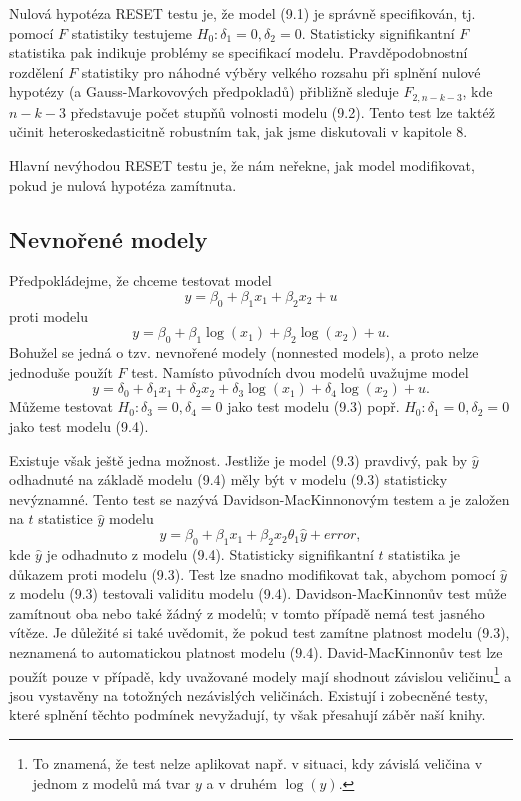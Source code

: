 Nulová hypotéza RESET testu je, že model (9.1) je správně specifikován, tj. pomocí $F$ statistiky testujeme $H_0: \delta_1 = 0, \delta_2 = 0$. Statisticky signifikantní $F$ statistika pak indikuje problémy se specifikací modelu. Pravděpodobnostní rozdělení $F$ statistiky pro náhodné výběry velkého rozsahu při splnění nulové hypotézy (a Gauss-Markovových předpokladů) přibližně sleduje $F_{2, n - k -3}$, kde $n - k - 3$ představuje počet stupňů volnosti modelu (9.2). Tento test lze taktéž učinit heteroskedasticitně robustním tak, jak jsme diskutovali v kapitole 8.

Hlavní nevýhodou RESET testu je, že nám neřekne, jak model modifikovat, pokud je nulová hypotéza zamítnuta.

\subsection{Nevnořené modely}

Předpokládejme, že chceme testovat model
\begin{equation}
y = \beta_0 + \beta_1 x_1 + \beta_2 x_2 + u
\end{equation}
proti modelu
\begin{equation}
y = \beta_0 + \beta_1 \log(x_1) + \beta_2 \log(x_2) + u.
\end{equation}
Bohužel se jedná o tzv. nevnořené modely (nonnested models), a proto nelze jednoduše použít $F$ test. Namísto původních dvou modelů uvažujme model
\begin{equation}
y = \delta_0 + \delta_1 x_1 + \delta_2 x_2 + \delta_3 \log(x_1) + \delta_4 \log(x_2) + u.
\end{equation}
Můžeme testovat $H_0: \delta_3 = 0, \delta_4 = 0$ jako test modelu (9.3) popř. $H_0: \delta_1 = 0, \delta_2 = 0$ jako test modelu (9.4).

Existuje však ještě jedna možnost. Jestliže je model (9.3) pravdivý, pak by $\hat{y}$ odhadnuté na základě modelu (9.4) měly být v modelu (9.3) statisticky nevýznamné. Tento test se nazývá Davidson-MacKinnonovým testem a je založen na $t$ statistice $\hat{y}$ modelu
\begin{equation}
y = \beta_0 + \beta_1 x_1 + \beta_2 x_2 \theta_1 \hat{y} + error,
\end{equation}
kde $\hat{y}$ je odhadnuto z modelu (9.4). Statisticky signifikantní $t$ statistika je důkazem proti modelu (9.3). Test lze snadno modifikovat tak, abychom pomocí $\hat{y}$ z modelu (9.3) testovali validitu modelu (9.4). Davidson-MacKinnonův test může zamítnout oba nebo také žádný z modelů; v tomto případě nemá test jasného vítěze. Je důležité si také uvědomit, že pokud test zamítne platnost modelu (9.3), neznamená to automatickou platnost modelu (9.4). David-MacKinnonův test lze použít pouze v případě, kdy uvažované modely mají shodnout závislou veličinu\footnote{To znamená, že test nelze aplikovat např. v situaci, kdy závislá veličina v jednom z modelů má tvar $y$ a v druhém $\log(y)$.} a jsou vystavěny na totožných nezávislých veličinách. Existují i zobecněné testy, které splnění těchto podmínek nevyžadují, ty však přesahují záběr naší knihy.

